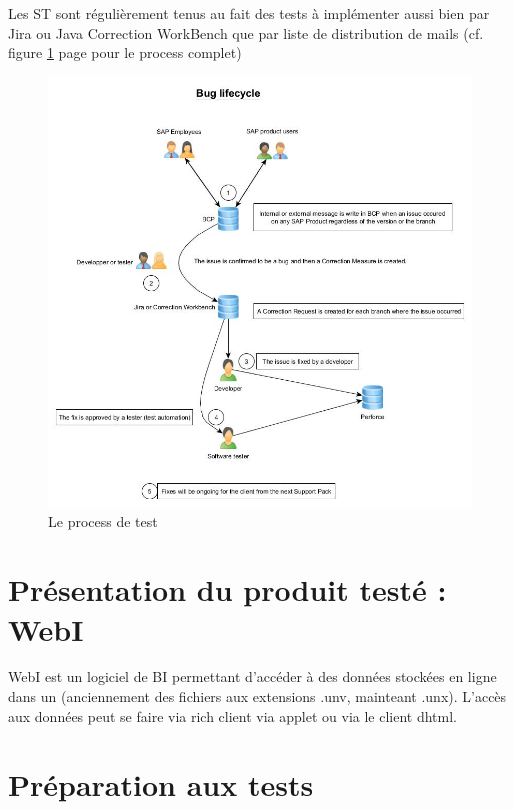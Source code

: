 Les ST sont r\'{e}guli\`{e}rement tenus au fait des tests \`{a} impl\'{e}menter aussi bien par Jira ou Java Correction WorkBench que par liste de distribution de mails (cf. figure \ref{figure:testProcess} page \pageref{figure:testProcess} pour le process complet)\\
\begin{figure}[!h]
  \centering
      \includegraphics[width=\textwidth]{images/testProcessAtSAP.jpg}
  \caption{Le process de test}
	\label{figure:testProcess}
\end{figure}



\section{Pr\'{e}sentation du produit test\'{e} : WebI}
WebI est un logiciel de BI permettant d'acc\'{e}der \`{a} des donn\'{e}es stock\'{e}es en ligne dans un  (anciennement des fichiers aux extensions .unv, mainteant .unx). L'acc\`{e}s aux donn\'{e}es peut se faire via rich client via applet ou via le client dhtml.


\section{Pr\'{e}paration aux tests}

